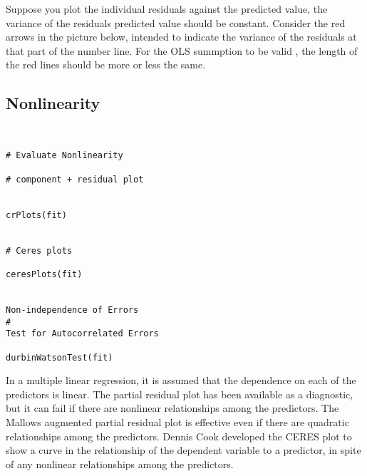 

\noindent Suppose you plot the individual residuals against the predicted value, the variance of the residuals predicted value should be constant. 
\bigskip
\noindent Consider the red arrows in the picture below, intended to indicate the variance of the residuals at that part of the number line. 
For the OLS summption to be valid , the length of the red lines should be more or less the same.

\subsection{Nonlinearity}

\begin{framed}

\begin{verbatim}


# Evaluate Nonlinearity

# component + residual plot 


crPlots(fit)


# Ceres plots 

ceresPlots(fit)


Non-independence of Errors
# 
Test for Autocorrelated Errors

durbinWatsonTest(fit)

\end{verbatim}

\end{framed}

In a multiple linear regression, it is assumed that the dependence on each of the predictors is linear. The partial residual plot has been available as a diagnostic, but it can fail if there are nonlinear relationships among the predictors. The Mallows augmented partial residual plot is effective even if there are quadratic relationships among the predictors. Dennis Cook developed the CERES plot to show a curve in the relationship of the dependent variable to a predictor, in spite of any nonlinear relationships among the predictors.

